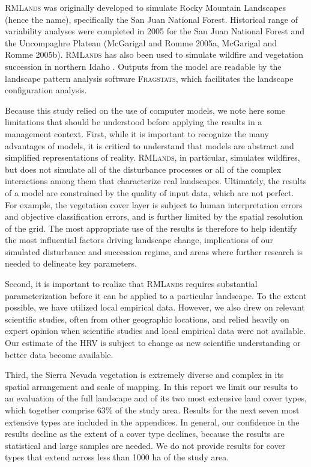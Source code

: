 \textsc{RMLands} was originally developed to simulate Rocky Mountain Landscapes (hence the name), specifically the San Juan National Forest. Historical range of variability analyses were completed in 2005 for the San Juan National Forest and the Uncompaghre Plateau (McGarigal and Romme 2005a, McGarigal and Romme 2005b). \textsc{RMLands} has also been used to simulate wildfire and vegetation succession in northern Idaho \citep{Cushman2011}. Outputs from the model are readable by the landscape pattern analysis software \textsc{Fragstats}, which facilitates the landscape configuration analysis.

Because this study relied on the use of computer models, we note here some limitations that should be understood before applying the results in a management context. First, while it is important to recognize the many advantages of models, it is critical to understand that models are abstract and simplified representations of reality. \textsc{RMLands}, in particular, simulates wildfires, but does not simulate all of the disturbance processes or all of the complex interactions among them that characterize real landscapes. Ultimately, the results of a model are constrained by the quality of input data, which are not perfect. For example, the vegetation cover layer is subject to human interpretation errors and objective classification errors, and is further limited by the spatial resolution of the grid. The most appropriate use of the results is therefore to help identify the most influential factors driving landscape change, implications of our simulated disturbance and succession regime, and areas where further research is needed to delineate key parameters.

Second, it is important to realize that \textsc{RMLands} requires substantial parameterization before it can be applied to a particular landscape. To the extent possible, we have utilized local empirical data. However, we also drew on relevant scientific studies, often from other geographic locations, and relied heavily on expert opinion when scientific studies and local empirical data were not available. Our estimate of the HRV is subject to change as new scientific understanding or better data become available.

Third, the Sierra Nevada vegetation is extremely diverse and complex in its spatial arrangement and scale of mapping. In this report we limit our results to an evaluation of the full landscape and of its two most extensive land cover types, which together comprise 63\% of the study area. Results for the next seven most extensive types are included in the appendices. In general, our confidence in the results decline as the extent of a cover type declines, because the results are statistical and large samples are needed. We do not provide results for cover types that extend across less than 1000 ha of the study area.


